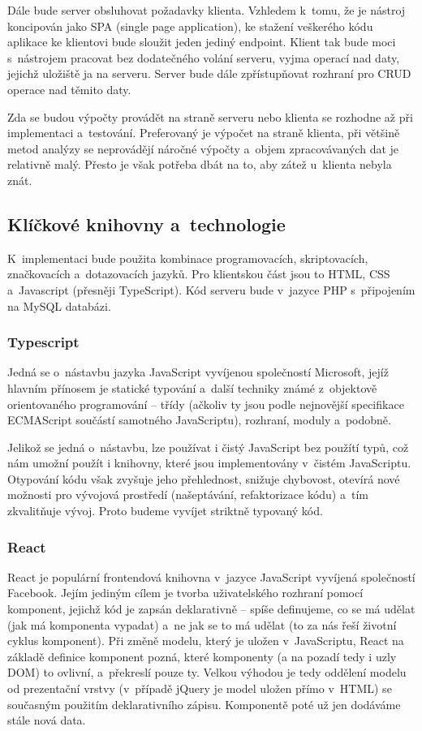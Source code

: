 Dále bude server obsluhovat požadavky klienta. Vzhledem k~tomu, že je nástroj koncipován jako SPA (single page application), ke stažení veškerého kódu aplikace ke klientovi bude sloužit jeden jediný endpoint. Klient tak bude moci s~nástrojem pracovat bez dodatečného volání serveru, vyjma operací nad daty, jejichž uložiště ja na serveru. Server bude dále zpřístupňovat rozhraní pro CRUD operace nad těmito daty.

Zda se budou výpočty provádět na straně serveru nebo klienta se rozhodne až při implementaci a~testování. Preferovaný je výpočet na straně klienta, při většině metod analýzy se neprovádějí náročné výpočty a~objem zpracovávaných dat je relativně malý. Přesto je však potřeba dbát na to, aby zátež u~klienta nebyla znát. 



\subsection{Klíčkové knihovny a~technologie}
K~implementaci bude použita kombinace programovacích, skriptovacích, značkovacích a~dotazovacích jazyků. Pro klientskou část jsou to HTML, CSS a~Javascript (přesněji TypeScript). Kód serveru bude v~jazyce PHP s~připojením na MySQL databázi.


\subsubsection{Typescript}
Jedná se o~nástavbu jazyka JavaScript vyvíjenou společností Microsoft, jejíž hlavním přínosem je statické typování a~další techniky známé z~objektově orientovaného programování -- třídy (ačkoliv ty jsou podle nejnovější specifikace ECMAScript součástí samotného JavaScriptu), rozhraní, moduly a~podobně.

Jelikož se jedná o~nástavbu, lze používat i čistý JavaScript bez použítí typů, což nám umožní použít i knihovny, které jsou implementovány v~čistém JavaScriptu. Otypování kódu však zvyšuje jeho přehlednost, snižuje chybovost, otevírá nové možnosti pro vývojová prostředí (našeptávání, refaktorizace kódu) a~tím zkvalitňuje vývoj. Proto budeme vyvíjet striktně typovaný kód. 


\subsubsection{React}
React je populární frontendová knihovna v~jazyce JavaScript vyvíjená společností Facebook. Jejím jediným cílem je tvorba uživatelského rozhraní pomocí komponent, jejichž kód je zapsán deklarativně -- spíše definujeme, co se má udělat (jak má komponenta vypadat) a~ne jak se to má udělat (to za nás řeší životní cyklus komponent). Při změně modelu, který je uložen v~JavaScriptu, React na základě definice komponent pozná, které komponenty (a na pozadí tedy i uzly DOM) to ovlivní, a~překreslí pouze ty. Velkou výhodou je tedy oddělení modelu od prezentační vrstvy (v~případě jQuery je model uložen přímo v~HTML) se současným použitím deklarativního zápisu. Komponentě poté už jen dodáváme stále nová data.

